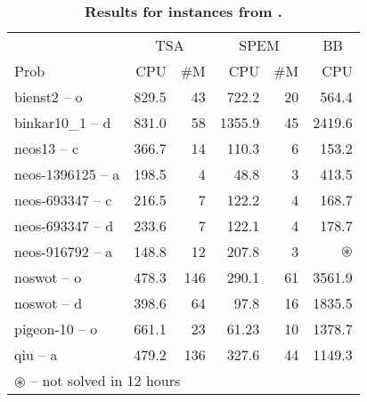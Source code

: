 \documentclass[12pt]{article}
\begin{document}
\begin{table}[h!]
\footnotesize
\caption{\textbf{Results for instances from \citep{adelgren2016}.}}\label{tab2}
\begin{tabular}{lrrrrr}
& \multicolumn{2}{c}{TSA} & \multicolumn{2}{c}{SPEM} & \multicolumn{1}{c}{BB}\\
\cline{2-3}
\cline{4-5}
\cline{6-6}
Prob & CPU & \#M & CPU & \#M & CPU\\
\hline
\hline
bienst2 -- o      & 829.5 & 43  & 722.2  & 20 & 564.4\\
binkar10\_1 -- d  & 831.0 & 58  & 1355.9 & 45 & 2419.6\\
neos13 -- c       & 366.7 & 14  & 110.3  & 6  & 153.2\\
neos-1396125 -- a & 198.5 & 4   & 48.8   & 3  & 413.5\\
neos-693347 -- c  & 216.5 & 7   & 122.2  & 4  & 168.7\\
neos-693347 -- d  & 233.6 & 7   & 122.1  & 4  & 178.7\\
neos-916792 -- a  & 148.8 & 12  & 207.8  & 3  & $\circledast$\\
noswot -- o       & 478.3 & 146 & 290.1  & 61 & 3561.9\\
noswot -- d       & 398.6 & 64  & 97.8   & 16 & 1835.5\\
pigeon-10 -- o    & 661.1 & 23  & 61.23  & 10 & 1378.7\\
qiu -- a          & 479.2 & 136 & 327.6  & 44 & 1149.3\\
\hline
\multicolumn{5}{l}{\scriptsize $\circledast$ -- not solved in 12 hours}
\end{tabular}
\end{table}
\end{document}

